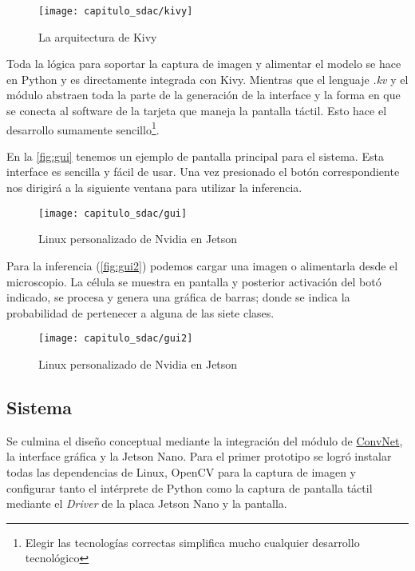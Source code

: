 \begin{figure}[H]
    \centering
    \texttt{[image: capitulo\_sdac/kivy]}
    \caption{La arquitectura de Kivy}\label{fig:kivy}
\end{figure}

Toda la lógica para soportar la captura de imagen y alimentar el modelo se hace
en Python y es directamente integrada con Kivy. Mientras que el lenguaje \emph{.kv} y
el módulo abstraen toda la parte de la generación de la interface y la forma en
que se conecta al software de la tarjeta que maneja la pantalla táctil. Esto
hace el desarrollo sumamente sencillo\footnote{Elegir las tecnologías correctas simplifica
mucho cualquier desarrollo tecnológico}.

En la \autoref{fig:gui} tenemos un ejemplo de pantalla principal para el
sistema. Esta interface es sencilla y fácil de usar. Una vez presionado el botón
correspondiente nos dirigirá a la siguiente ventana para utilizar la inferencia.

\begin{figure}[]
    \centering
    \texttt{[image: capitulo\_sdac/gui]}
    \caption{Linux personalizado de Nvidia en Jetson}\label{fig:gui}
\end{figure}

Para la inferencia (\autoref{fig:gui2}) podemos cargar una imagen o alimentarla
desde el microscopio. La célula se muestra en pantalla y posterior activación
del botó indicado, se procesa y genera una gráfica de barras; donde se indica la
probabilidad de pertenecer a alguna de las siete clases.

\begin{figure}[]
    \centering
    \texttt{[image: capitulo\_sdac/gui2]}
    \caption{Linux personalizado de Nvidia en Jetson}\label{fig:gui2}
\end{figure}


\subsection{Sistema}

Se culmina el diseño conceptual mediante la integración del módulo de
\hyperlink{abbr}{ConvNet}, la interface gráfica y la Jetson Nano. Para el primer
prototipo se logró instalar todas las dependencias de Linux, OpenCV para la
captura de imagen y configurar tanto el intérprete de Python como la captura de
pantalla táctil mediante el \emph{Driver} de la placa Jetson Nano y la pantalla.

